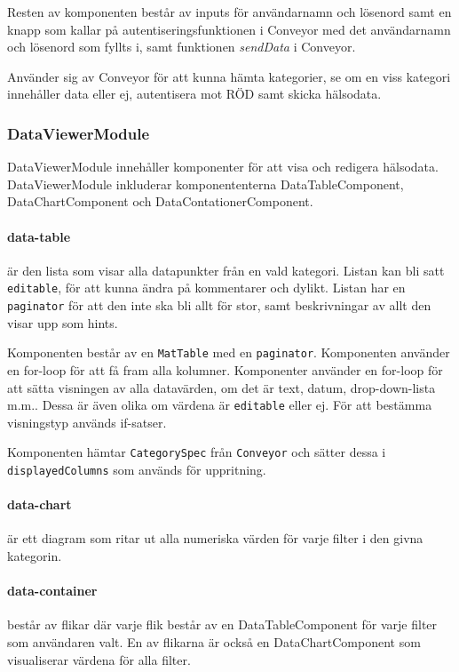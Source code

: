 \documentclass[techdoc/techdock.tex]{subfiles}
\begin{document}
Resten av komponenten består av inputs för användarnamn och lösenord samt en
knapp som kallar på autentiseringsfunktionen i Conveyor med det användarnamn
och lösenord som fyllts i, samt funktionen \textit{sendData} i Conveyor.

Använder sig av Conveyor för att kunna hämta kategorier, se om en viss kategori
innehåller data eller ej, autentisera mot RÖD samt skicka hälsodata.

\subsubsection{DataViewerModule}
DataViewerModule innehåller komponenter för att visa och redigera hälsodata.
DataViewerModule inkluderar komponententerna DataTableComponent,
DataChartComponent och DataContationerComponent.

\paragraph{data-table} är den lista som visar alla datapunkter från en vald
kategori. Listan kan bli satt \texttt{editable}, för att kunna ändra på
kommentarer och dylikt.  Listan har en \texttt{paginator} för att den inte ska
bli allt för stor, samt beskrivningar av allt den visar upp som hints.

Komponenten består av en \texttt{MatTable} med en \texttt{paginator}.
Komponenten använder en for-loop för att få fram alla kolumner. Komponenter
använder en for-loop för att sätta visningen av alla datavärden, om det är
text, datum, drop-down-lista m.m.. Dessa är även olika om värdena är
\texttt{editable} eller ej. För att bestämma visningstyp används if-satser.

Komponenten hämtar \texttt{CategorySpec} från \texttt{Conveyor} och sätter
dessa i \texttt{displayedColumns} som används för uppritning.

\paragraph{data-chart}
är ett diagram som ritar ut alla numeriska värden för varje filter i den givna
kategorin.

\paragraph{data-container}
består av flikar där varje flik består av en DataTableComponent för varje
filter som användaren valt. En av flikarna är också en DataChartComponent som
visualiserar värdena för alla filter.
\end{document}
